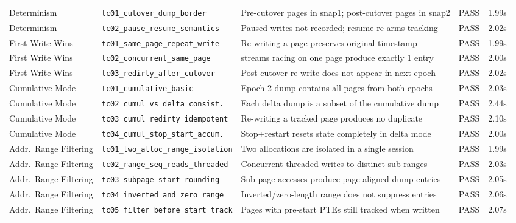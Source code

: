 \begin{center}
\begin{longtable}{>{\raggedright\arraybackslash}p{2.0cm} >{\raggedright\arraybackslash}p{4.5cm} >{\raggedright\arraybackslash}p{6.2cm} >{\raggedright\arraybackslash}p{1.0cm} >{\raggedright\arraybackslash}p{1.1cm}}
Determinism & \texttt{tc01\_cutover\_dump\_border} & Pre-cutover pages in snap1; post-cutover pages in snap2 & PASS & 1.99s \\
Determinism & \texttt{tc02\_pause\_resume\_semantics} & Paused writes not recorded; resume re-arms tracking & PASS & 2.02s \\
\midrule

First Write Wins & \texttt{tc01\_same\_page\_repeat\_write} & Re-writing a page preserves original timestamp & PASS & 1.99s \\
First Write Wins & \texttt{tc02\_concurrent\_same\_page} & 64 streams racing on one page produce exactly 1 entry & PASS & 2.00s \\
First Write Wins & \texttt{tc03\_redirty\_after\_cutover} & Post-cutover re-write does not appear in next epoch & PASS & 2.02s \\
\midrule

Cumulative Mode & \texttt{tc01\_cumulative\_basic} & Epoch 2 dump contains all pages from both epochs & PASS & 2.03s \\
Cumulative Mode & \texttt{tc02\_cumul\_vs\_delta\_consist.} & Each delta dump is a subset of the cumulative dump & PASS & 2.44s \\
Cumulative Mode & \texttt{tc03\_cumul\_redirty\_idempotent} & Re-writing a tracked page produces no duplicate & PASS & 2.10s \\
Cumulative Mode & \texttt{tc04\_cumul\_stop\_start\_accum.} & Stop+restart resets state completely in delta mode & PASS & 2.00s \\
\midrule

Addr.\ Range Filtering & \texttt{tc01\_two\_alloc\_range\_isolation} & Two allocations are isolated in a single session & PASS & 1.99s \\
Addr.\ Range Filtering & \texttt{tc02\_range\_seq\_reads\_threaded} & Concurrent threaded writes to distinct sub-ranges & PASS & 2.03s \\
Addr.\ Range Filtering & \texttt{tc03\_subpage\_start\_rounding} & Sub-page accesses produce page-aligned dump entries & PASS & 2.05s \\
Addr.\ Range Filtering & \texttt{tc04\_inverted\_and\_zero\_range} & Inverted/zero-length range does not suppress entries & PASS & 2.06s \\
Addr.\ Range Filtering & \texttt{tc05\_filter\_before\_start\_track} & Pages with pre-start PTEs still tracked when written & PASS & 2.07s \\
\midrule


\end{longtable}
\end{center}
